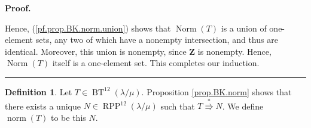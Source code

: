 \documentclass[12pt]{article}
\theoremstyle{plain}
\theoremstyle{definition}
\newtheorem{definition}[theorem]{Definition}
\newenvironment{proof}[1][Proof]{\noindent\textbf{#1.} }{\ \rule{0.5em}{0.5em}}
\def\OneTwoRPP{{\operatorname{RPP}^{12}\left(  \lambda/\mu\right)}}
\def\BenignTables{{\operatorname{BT}^{12}\left(  \lambda/\mu\right)}}
\begin{document}
\begin{proof}
\begin{itemize}
% 

\end{itemize}

Hence, (\ref{pf.prop.BK.norm.union}) shows that $\operatorname*{Norm}\left(
T\right)  $ is a union of one-element sets, any two of which have a nonempty
intersection, and thus are identical.
Moreover, this union is nonempty, since $\mathbf{Z}$ is nonempty. Hence,
$\operatorname*{Norm}\left(  T\right)  $ itself is a one-element set. This
completes our induction.
\end{proof}

\begin{definition}
Let $T\in\BenignTables$. Proposition \ref{prop.BK.norm} shows that there exists a
unique $N\in\OneTwoRPP$ such that $T\overset{\ast}{\Rrightarrow}N$. We define
$\operatorname*{norm}\left(  T\right)  $ to be this $N$.
\end{definition}
\end{document}
